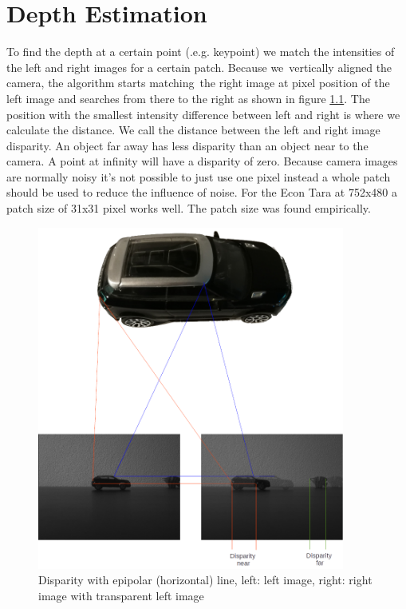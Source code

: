 \documentclass[11pt,a4paper,titlepage,oneside]{report}
\begin{document}
\chapter{Depth Estimation}\label{ch:depth}

To find the depth at a certain point (.e.g. keypoint) we match the intensities of the left and right images for a certain patch. Because we vertically aligned the camera, the algorithm starts matching the right image at pixel position of the left image and searches from there to the right as shown in figure \ref{fig:disparity}. The position with the smallest intensity difference between left and right is where we calculate the distance. We call the distance between the left and right image disparity. An object far away has less disparity than an object near to the camera. A point at infinity will have a disparity of zero. Because camera images are normally noisy it's not possible to just use one pixel instead a whole patch should be used to reduce the influence of noise. For the Econ Tara at 752x480 a patch size of 31x31 pixel works well. The patch size was found empirically.

\begin{figure}[H]
  \begin{center}
    \includegraphics[width=0.9\textwidth]{img/disparity_concept.png}
  \end{center}
  \caption{Disparity with epipolar (horizontal) line, left: left image, right: right image with transparent left image}\label{fig:disparity}
\end{figure}
\end{document}

